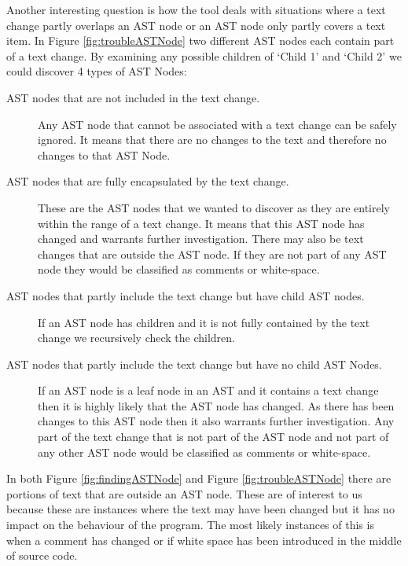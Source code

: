 Another interesting question is how the tool deals with situations where a text change partly overlaps an AST node or an AST node only partly covers a text item.  
In Figure \ref{fig:troubleASTNode} two different AST nodes each contain part of a text change. 
By examining any possible children of `Child 1' and `Child 2' we could discover 4 types of AST Nodes:
\begin{description}

  \item [AST nodes that are not included in the text change.]
    Any AST node that cannot be associated with a text change can be safely ignored. 
    It means that there are no changes to the text and therefore no changes to that AST Node.
  \item [AST nodes that are fully encapsulated by the text change.] 
    These are the AST nodes that we wanted to discover as they are entirely within the range of a text change.
    It means that this AST node has changed and warrants further investigation. 
    There may also be text changes that are outside the AST node.
    If they are not part of any AST node they would be classified as comments or white-space. 
  \item [AST nodes that partly include the text change but have child AST nodes.]
    If an AST node has children and it is not fully contained by the text change we recursively check the children.
  \item [AST nodes that partly include the text change but have no child AST Nodes.]
    If an AST node is a leaf node in an AST and it contains a text change then it is highly likely that the AST node has changed.
    As there has been changes to this AST node then it also warrants further investigation. 
    Any part of the text change that is not part of the AST node and not part of any other AST node would be classified as comments or white-space.    
\end{description}

In both Figure \ref{fig:findingASTNode} and Figure \ref{fig:troubleASTNode} there are portions of text that are outside an AST node.  These are of interest to us because these are instances where the text may have been changed but it has no impact on the behaviour of the program.  The most likely instances of this is when a comment has changed or if white space has been introduced in the middle of source code.

% 

